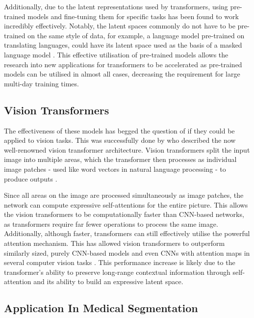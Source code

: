 \documentclass{l4proj}
\begin{document}
Additionally, due to the latent representations used by transformers, using pre-trained models and fine-tuning them for specific tasks has been found to work incredibly effectively. Notably, the latent spaces commonly do not have to be pre-trained on the same style of data, for example, a language model pre-trained on translating languages, could have its latent space used as the basis of a masked language model \citep{dosovitskiy2020image}. This effective utilisation of pre-trained models allows the research into new applications for transformers to be accelerated as pre-trained models can be utilised in almost all cases, decreasing the requirement for large multi-day training times.

	\subsection{Vision Transformers}

The effectiveness of these models has begged the question of if they could be applied to vision tasks. This was successfully done by \cite{dosovitskiy2020image} who described the now well-renowned vision transformer architecture. Vision transformers split the input image into multiple areas, which the transformer then processes as individual image patches - used like word vectors in natural language processing - to produce outputs \citep{dosovitskiy2020image}.

Since all areas on the image are processed simultaneously as image patches, the network can compute expressive self-attentions for the entire picture. This allows the vision transformers to be computationally faster than CNN-based networks, as transformers require far fewer operations to process the same image. Additionally, although faster, transformers can still effectively utilise the powerful attention mechanism. This has allowed vision transformers to outperform similarly sized, purely CNN-based models and even CNNs with attention maps in several computer vision tasks \citep{dosovitskiy2020image}. This performance increase is likely due to the transformer’s ability to preserve long-range contextual information through self-attention and its ability to build an expressive latent space.

	\subsection{Application In Medical Segmentation}
\end{document}

